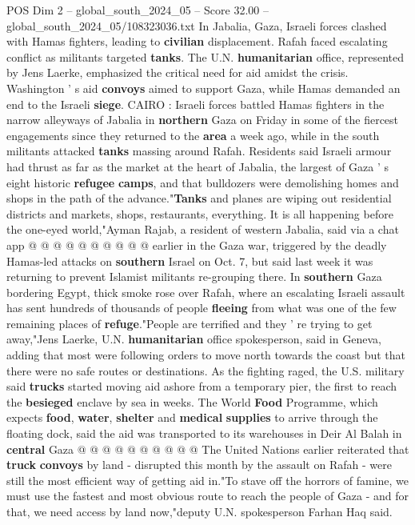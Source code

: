 \begin{textsample}{POS Dim 2 – global\_south\_2024\_05 – Score 32.00 – global\_south\_2024\_05/108323036.txt}  \label{ex:f2_pos_071}
In Jabalia, Gaza, Israeli forces clashed with Hamas fighters, leading to \textbf{civilian} displacement.
Rafah faced escalating conflict as militants targeted \textbf{tanks}.
The U.N. \textbf{humanitarian} office, represented by Jens Laerke, emphasized the critical need for aid amidst the crisis.
Washington ' s aid \textbf{convoys} aimed to support Gaza, while Hamas demanded an end to the Israeli \textbf{siege}.
CAIRO : Israeli forces battled Hamas fighters in the narrow alleyways of Jabalia in \textbf{northern} Gaza on Friday in some of the fiercest engagements since they returned to the \textbf{area} a week ago, while in the south militants attacked \textbf{tanks} massing around Rafah.
Residents said Israeli armour had thrust as far as the market at the heart of Jabalia, the largest of Gaza ' s eight historic \textbf{refugee} \textbf{camps}, and that bulldozers were demolishing homes and shops in the path of the advance."\textbf{Tanks} and planes are wiping out residential districts and markets, shops, restaurants, everything.
It is all happening before the one-eyed world,"Ayman Rajab, a resident of western Jabalia, said via a chat app @ @ @ @ @ @ @ @ @ @ earlier in the Gaza war, triggered by the deadly Hamas-led attacks on \textbf{southern} Israel on Oct. 7, but said last week it was returning to prevent Islamist militants re-grouping there.
In \textbf{southern} Gaza bordering Egypt, thick smoke rose over Rafah, where an escalating Israeli assault has sent hundreds of thousands of people \textbf{fleeing} from what was one of the few remaining places of \textbf{refuge}."People are terrified and they ' re trying to get away,"Jens Laerke, U.N. \textbf{humanitarian} office spokesperson, said in Geneva, adding that most were following orders to move north towards the coast but that there were no safe routes or destinations.
As the fighting raged, the U.S. military said \textbf{trucks} started moving aid ashore from a temporary pier, the first to reach the \textbf{besieged} enclave by sea in weeks.
The World \textbf{Food} Programme, which expects \textbf{food}, \textbf{water}, \textbf{shelter} and \textbf{medical} \textbf{supplies} to arrive through the floating dock, said the aid was transported to its warehouses in Deir Al Balah in \textbf{central} Gaza @ @ @ @ @ @ @ @ @ @ The United Nations earlier reiterated that \textbf{truck} \textbf{convoys} by land - disrupted this month by the assault on Rafah - were still the most efficient way of getting aid in."To stave off the horrors of famine, we must use the fastest and most obvious route to reach the people of Gaza - and for that, we need access by land now,"deputy U.N. spokesperson Farhan Haq said.

\end{textsample}
